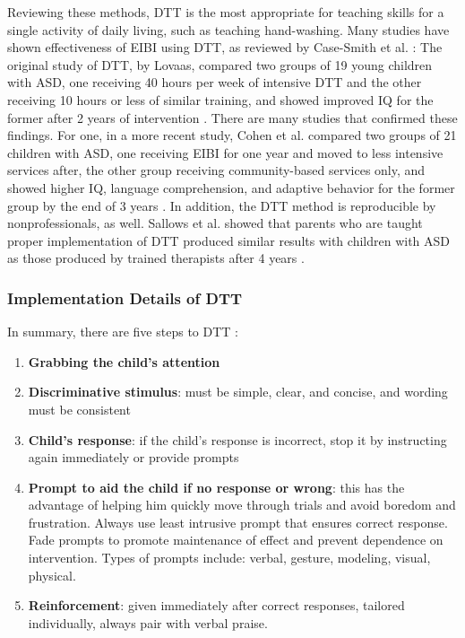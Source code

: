 Reviewing these methods, DTT is the most appropriate for teaching skills for a single activity of daily living, such as teaching hand-washing.  Many studies have shown effectiveness of EIBI using DTT, as reviewed by Case-Smith et al. \cite{case2008evidence}: The original study of DTT, by Lovaas, compared two groups of 19 young children with ASD, one receiving 40 hours per week of intensive DTT and the other receiving 10 hours or less of similar training, and showed improved IQ for the former after 2 years of intervention \cite{lovaas1987behavioral}.  There are many studies that confirmed these findings.  For one, in a more recent study, Cohen et al. compared two groups of 21 children with ASD, one receiving EIBI for one year and moved to less intensive services after, the other group receiving community-based services only, and showed higher IQ, language comprehension, and adaptive behavior for the former group by the end of 3 years \cite{cohen2006early}.  In addition, the DTT method is reproducible by nonprofessionals, as well.  Sallows et al. showed that parents who are taught proper implementation of DTT produced similar results with children with ASD as those produced by trained therapists after 4 years \cite{sallows2005intensive}.

\subsubsection{Implementation Details of DTT}
In summary, there are five steps to DTT \cite{bogin2010steps}:
\begin{enumerate}
	\item \textbf{Grabbing the child's attention}
	\item \textbf{Discriminative stimulus}: must be simple, clear, and concise, and wording must be consistent
	\item \textbf{Child's response}: if the child's response is incorrect, stop it by instructing again immediately or provide prompts
	\item \textbf{Prompt to aid the child if no response or wrong}: this has the advantage of helping him quickly move through trials and avoid boredom and frustration.  Always use least intrusive prompt that ensures correct response.  Fade prompts to promote maintenance of effect and prevent dependence on intervention.  Types of prompts include: verbal, gesture, modeling, visual, physical.
	\item \textbf{Reinforcement}: given immediately after correct responses, tailored individually, always pair with verbal praise.
\end{enumerate}
